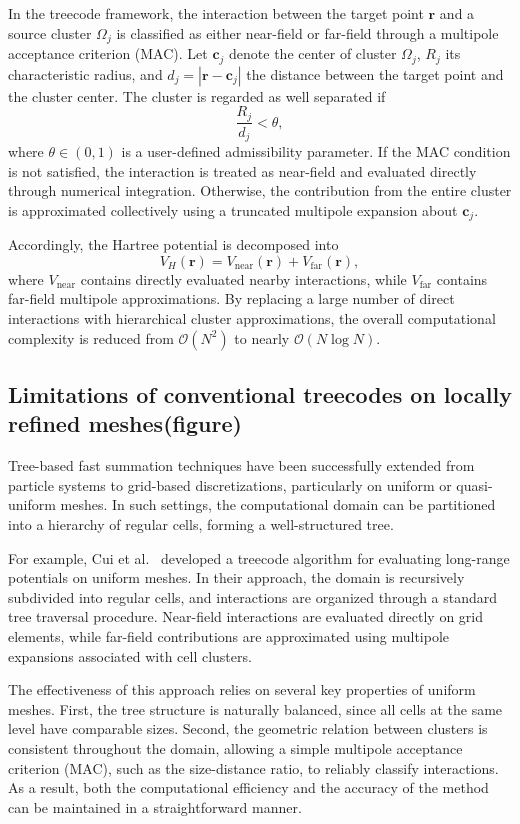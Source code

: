 \documentclass[a4paper,10pt]{article}
\begin{document}
In the treecode framework,
the interaction between the target point $\mathbf r$
and a source cluster $\Omega_j$
is classified as either near-field or far-field
through a multipole acceptance criterion (MAC).
Let $\mathbf c_j$ denote the center of cluster $\Omega_j$,
$R_j$ its characteristic radius,
and $d_j = |\mathbf r - \mathbf c_j|$
the distance between the target point
and the cluster center.
The cluster is regarded as well separated if
\[
\frac{R_j}{d_j} < \theta,
\]
where $\theta \in (0,1)$
is a user-defined admissibility parameter.
If the MAC condition is not satisfied,
the interaction is treated as near-field
and evaluated directly through numerical integration.
Otherwise,
the contribution from the entire cluster
is approximated collectively
using a truncated multipole expansion about $\mathbf c_j$.

Accordingly,
the Hartree potential is decomposed into
\[
V_H(\mathbf r)
=
V_{\mathrm{near}}(\mathbf r)
+
V_{\mathrm{far}}(\mathbf r),
\]
where $V_{\mathrm{near}}$
contains directly evaluated nearby interactions,
while $V_{\mathrm{far}}$
contains far-field multipole approximations.
By replacing a large number of direct interactions
with hierarchical cluster approximations,
the overall computational complexity
is reduced from $\mathcal{O}(N^2)$
to nearly $\mathcal{O}(N\log N)$.
\subsection{Limitations of conventional treecodes on locally refined meshes(\color{red}figure)}

Tree-based fast summation techniques have been successfully
extended from particle systems to grid-based discretizations,
particularly on uniform or quasi-uniform meshes.
In such settings, the computational domain can be partitioned
into a hierarchy of regular cells, forming a well-structured tree.

For example, Cui et al.~\cite{Cui} developed a treecode algorithm
for evaluating long-range potentials on uniform meshes.
In their approach, the domain is recursively subdivided into
regular cells, and interactions are organized through a standard
tree traversal procedure.
Near-field interactions are evaluated directly on grid elements,
while far-field contributions are approximated using multipole
expansions associated with cell clusters.

The effectiveness of this approach relies on several key properties
of uniform meshes.
First, the tree structure is naturally balanced, since all cells
at the same level have comparable sizes.
Second, the geometric relation between clusters is consistent
throughout the domain, allowing a simple multipole acceptance
criterion (MAC), such as the size-distance ratio, to reliably
classify interactions.
As a result, both the computational efficiency and the accuracy
of the method can be maintained in a straightforward manner.
\end{document}

